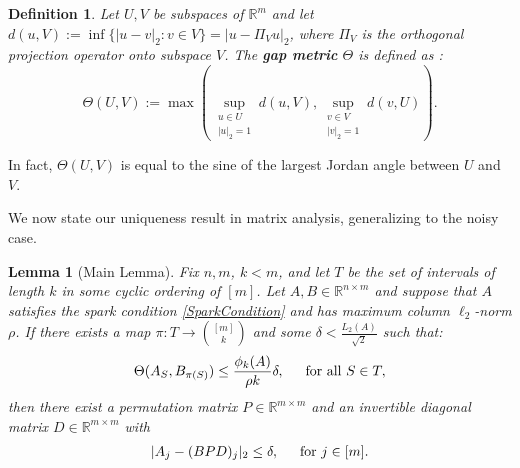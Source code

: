 \documentclass[journal, twocolumn]{IEEEtran}
\newtheorem{lemma}{Lemma}
\newtheorem{definition}{Definition}
\begin{document}
\begin{definition}\label{GapMetricDef}
Let $U, V$ be subspaces of $\mathbb{R}^m$ and let $d(u,V) := \inf\{|u-v|_2: v \in V\} = |u - \Pi_V u|_2$, where $\Pi_V$ is the orthogonal projection operator onto subspace $V$. The \textbf{gap metric} $\Theta$ is defined as \cite{Akhiezer13}:
\begin{equation*}
\Theta(U,V) := \max\left( \sup_{\substack{u \in U \\ |u|_2 = 1}} d(u,V), \sup_{\substack{v \in V \\ |v|_2 = 1}} d(v,U) \right).
\end{equation*}
\end{definition}

In fact, $\Theta(U,V)$ is equal to the sine of the largest Jordan angle between $U$ and $V$. 

We now state our uniqueness result in matrix analysis, generalizing \cite[Lem.~1]{Hillar15} to the noisy case.

\begin{lemma}[Main Lemma]\label{MainLemma}
Fix $n, m$, $k < m$, and let $T$ be the set of intervals of length $k$ in some cyclic ordering of $[m]$. Let $A, B \in \mathbb{R}^{n \times m}$ and suppose that $A$ satisfies the spark condition \eqref{SparkCondition} and has maximum column $\ell_2$-norm $\rho$.  If there exists a map $\pi: T \to {[m] \choose k}$ and some $\delta < \frac{L_{2}(A)}{\sqrt{2}}$ such that: 
\begin{equation}\label{GapUpperBound}
\Theta(A_{S}, B_{\pi(S)}) \leq \frac{ \phi_k(A) }{\rho k} \delta, \indent \text{for all } S \in T,
\end{equation}
%
then there exist a permutation matrix $P \in \mathbb{R}^{m \times m}$ and an invertible diagonal matrix $D \in \mathbb{R}^{m \times m}$ with
\begin{align}\label{MainLemmaBPD}
|A_j - (BPD)_j|_2 \leq \delta, \indent \text{for } j \in [m].
\end{align}
\end{lemma}
\end{document}
